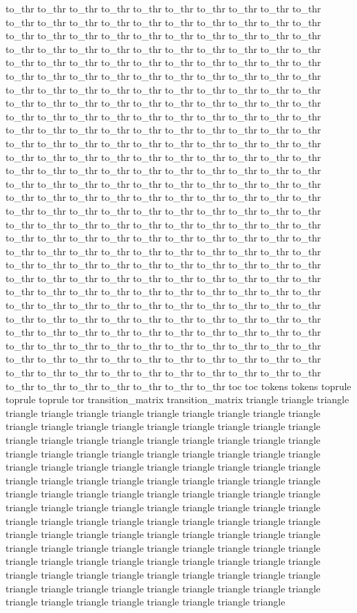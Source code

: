 to_thr to_thr to_thr to_thr to_thr to_thr to_thr to_thr to_thr to_thr to_thr to_thr to_thr to_thr to_thr to_thr to_thr to_thr to_thr to_thr to_thr to_thr to_thr to_thr to_thr to_thr to_thr to_thr to_thr to_thr to_thr to_thr to_thr to_thr to_thr to_thr to_thr to_thr to_thr to_thr to_thr to_thr to_thr to_thr to_thr to_thr to_thr to_thr to_thr to_thr to_thr to_thr to_thr to_thr to_thr to_thr to_thr to_thr to_thr to_thr to_thr to_thr to_thr to_thr to_thr to_thr to_thr to_thr to_thr to_thr to_thr to_thr to_thr to_thr to_thr to_thr to_thr to_thr to_thr to_thr to_thr to_thr to_thr to_thr to_thr to_thr to_thr to_thr to_thr to_thr to_thr to_thr to_thr to_thr to_thr to_thr to_thr to_thr to_thr to_thr to_thr to_thr to_thr to_thr to_thr to_thr to_thr to_thr to_thr to_thr to_thr to_thr to_thr to_thr to_thr to_thr to_thr to_thr to_thr to_thr to_thr to_thr to_thr to_thr to_thr to_thr to_thr to_thr to_thr to_thr to_thr to_thr to_thr to_thr to_thr to_thr to_thr to_thr to_thr to_thr to_thr to_thr to_thr to_thr to_thr to_thr to_thr to_thr to_thr to_thr to_thr to_thr to_thr to_thr to_thr to_thr to_thr to_thr to_thr to_thr to_thr to_thr to_thr to_thr to_thr to_thr to_thr to_thr to_thr to_thr to_thr to_thr to_thr to_thr to_thr to_thr to_thr to_thr to_thr to_thr to_thr to_thr to_thr to_thr to_thr to_thr to_thr to_thr to_thr to_thr to_thr to_thr to_thr to_thr to_thr to_thr to_thr to_thr to_thr to_thr to_thr to_thr to_thr to_thr to_thr to_thr to_thr to_thr to_thr to_thr to_thr to_thr to_thr to_thr to_thr to_thr to_thr to_thr to_thr to_thr to_thr to_thr to_thr to_thr to_thr to_thr to_thr to_thr to_thr to_thr to_thr to_thr to_thr to_thr to_thr to_thr to_thr to_thr to_thr to_thr to_thr to_thr to_thr to_thr to_thr to_thr to_thr to_thr to_thr to_thr to_thr to_thr to_thr to_thr to_thr to_thr to_thr to_thr to_thr to_thr to_thr to_thr to_thr to_thr to_thr to_thr to_thr to_thr to_thr to_thr to_thr to_thr to_thr to_thr to_thr to_thr to_thr to_thr to_thr to_thr to_thr to_thr to_thr to_thr to_thr to_thr to_thr toc toc tokens tokens toprule toprule toprule tor transition_matrix transition_matrix triangle triangle triangle triangle triangle triangle triangle triangle triangle triangle triangle triangle triangle triangle triangle triangle triangle triangle triangle triangle triangle triangle triangle triangle triangle triangle triangle triangle triangle triangle triangle triangle triangle triangle triangle triangle triangle triangle triangle triangle triangle triangle triangle triangle triangle triangle triangle triangle triangle triangle triangle triangle triangle triangle triangle triangle triangle triangle triangle triangle triangle triangle triangle triangle triangle triangle triangle triangle triangle triangle triangle triangle triangle triangle triangle triangle triangle triangle triangle triangle triangle triangle triangle triangle triangle triangle triangle triangle triangle triangle triangle triangle triangle triangle triangle triangle triangle triangle triangle triangle triangle triangle triangle triangle triangle triangle triangle triangle triangle triangle triangle triangle triangle triangle triangle triangle triangle triangle triangle triangle triangle triangle triangle triangle triangle triangle triangle triangle triangle triangle triangle triangle triangle triangle triangle triangle triangle 